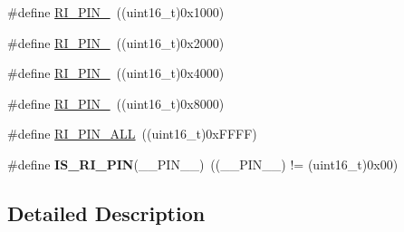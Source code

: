 \begin{DoxyCompactItemize}
\item 
\#define \hyperlink{group___r_i___pin_gaaccc7bafa925a119c19e6ad8a648cce2}{R\-I\-\_\-\-P\-I\-N\-\_}~((uint16\-\_\-t)0x1000)
\item 
\#define \hyperlink{group___r_i___pin_ga155ffce85eb8da785a973bc239db95e3}{R\-I\-\_\-\-P\-I\-N\-\_}~((uint16\-\_\-t)0x2000)
\item 
\#define \hyperlink{group___r_i___pin_gafa312ad93801f8c9e12eefd7ded80992}{R\-I\-\_\-\-P\-I\-N\-\_}~((uint16\-\_\-t)0x4000)
\item 
\#define \hyperlink{group___r_i___pin_ga4d6732c2e125652e77c35e213ac21d86}{R\-I\-\_\-\-P\-I\-N\-\_}~((uint16\-\_\-t)0x8000)
\item 
\#define \hyperlink{group___r_i___pin_ga45ed67020370018f1964e7686e9d7187}{R\-I\-\_\-\-P\-I\-N\-\_\-\-A\-L\-L}~((uint16\-\_\-t)0x\-F\-F\-F\-F)
\item 
\hypertarget{group___r_i___pin_ga00b40a9de92cd35a34b0ddabd5e074b8}{\#define {\bfseries I\-S\-\_\-\-R\-I\-\_\-\-P\-I\-N}(\-\_\-\-\_\-\-P\-I\-N\-\_\-\-\_\-)~((\-\_\-\-\_\-\-P\-I\-N\-\_\-\-\_\-) != (uint16\-\_\-t)0x00)}\label{group___r_i___pin_ga00b40a9de92cd35a34b0ddabd5e074b8}

\end{DoxyCompactItemize}


\subsection{Detailed Description}


